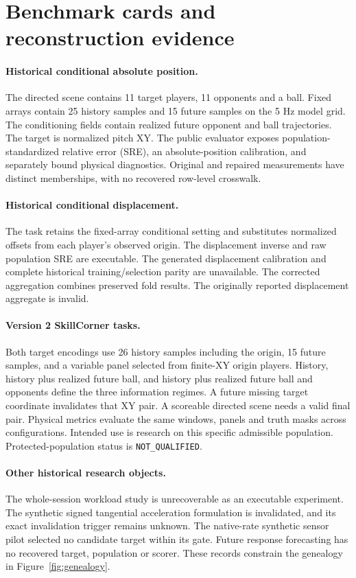 \section{Benchmark cards and reconstruction evidence}
\label{app:cards}

\paragraph{Historical conditional absolute position.}
The directed scene contains 11 target players, 11 opponents and a ball. Fixed arrays contain 25 history samples and 15 future samples on the 5 Hz model grid. The conditioning fields contain realized future opponent and ball trajectories. The target is normalized pitch XY. The public evaluator exposes population-standardized relative error (SRE), an absolute-position calibration, and separately bound physical diagnostics. Original and repaired measurements have distinct memberships, with no recovered row-level crosswalk.

\paragraph{Historical conditional displacement.}
The task retains the fixed-array conditional setting and substitutes normalized offsets from each player's observed origin. The displacement inverse and raw population SRE are executable. The generated displacement calibration and complete historical training/selection parity are unavailable. The corrected aggregation combines preserved fold results. The originally reported displacement aggregate is invalid.

\paragraph{Version 2 SkillCorner tasks.}
Both target encodings use 26 history samples including the origin, 15 future samples, and a variable panel selected from finite-XY origin players. History, history plus realized future ball, and history plus realized future ball and opponents define the three information regimes. A future missing target coordinate invalidates that XY pair. A scoreable directed scene needs a valid final pair. Physical metrics evaluate the same windows, panels and truth masks across configurations. Intended use is research on this specific admissible population. Protected-population status is \texttt{NOT\_QUALIFIED}.

\paragraph{Other historical research objects.}
The whole-session workload study is unrecoverable as an executable experiment. The synthetic signed tangential acceleration formulation is invalidated, and its exact invalidation trigger remains unknown. The native-rate synthetic sensor pilot selected no candidate target within its gate. Future response forecasting has no recovered target, population or scorer. These records constrain the genealogy in Figure~\ref{fig:genealogy}.

